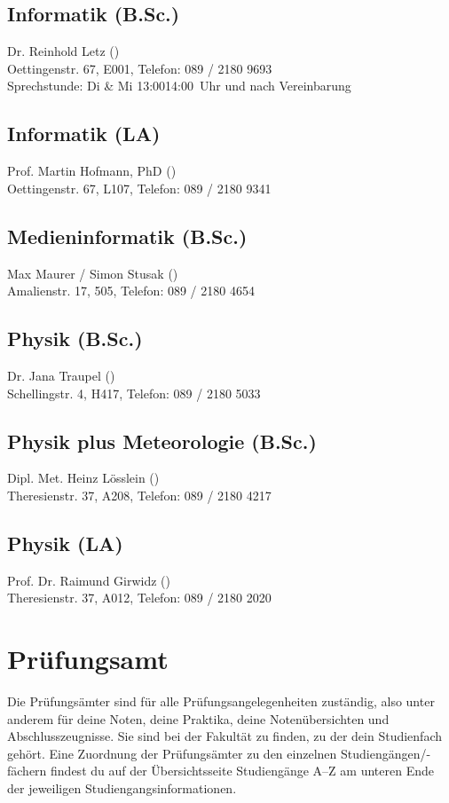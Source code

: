 \subsection*{Informatik (B.Sc.)}
Dr. Reinhold Letz ()\\
Oettingenstr. 67, E001, Telefon: 089 / 2180 \emd{} 9693\\
Sprechstunde: Di \& Mi 13:00\emd{}14:00~Uhr und nach Vereinbarung

\subsection*{Informatik (LA)}
Prof. Martin Hofmann, PhD ()\\
Oettingenstr. 67, L107, Telefon: 089 / 2180 \emd{} 9341

\subsection*{Medieninformatik (B.Sc.)}
Max Maurer / Simon Stusak ()\\
Amalienstr. 17, 505, Telefon: 089 / 2180 \emd{} 4654

\subsection*{Physik (B.Sc.)}
Dr. Jana Traupel ()\\
Schellingstr. 4, H417, Telefon: 089 / 2180 \emd{} 5033

\subsection*{Physik plus Meteorologie (B.Sc.)}
Dipl. Met. Heinz Lösslein ()\\
Theresienstr. 37, A208, Telefon: 089 / 2180 \emd{} 4217

\subsection*{Physik (LA)}
Prof. Dr. Raimund Girwidz ()\\
Theresienstr. 37, A012, Telefon: 089 / 2180 \emd{} 2020


\section{Prüfungsamt}
Die Prüfungsämter sind für alle Prüfungsangelegenheiten zuständig,
also unter anderem für deine Noten, deine Praktika, deine Notenübersichten und
Abschlusszeugnisse. Sie sind bei der Fakultät zu finden, zu der
dein Studienfach gehört. Eine Zuordnung der Prüfungsämter zu den
einzelnen Studiengängen/-fächern findest du auf der Übersichtsseite
Studiengänge A--Z am unteren Ende der jeweiligen
Studiengangsinformationen.

